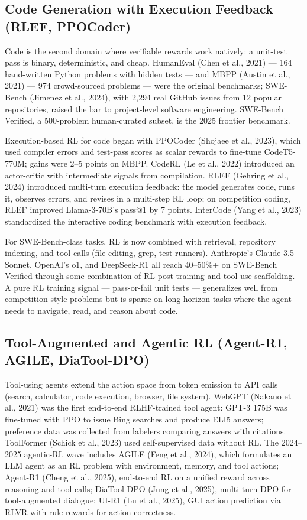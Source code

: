 \subsection{Code Generation with Execution Feedback (RLEF, PPOCoder)}\label{code-generation-with-execution-feedback-rlef-ppocoder}

Code is the second domain where verifiable rewards work natively: a unit-test pass is binary, deterministic, and cheap. HumanEval (Chen et al., 2021) --- 164 hand-written Python problems with hidden tests --- and MBPP (Austin et al., 2021) --- 974 crowd-sourced problems --- were the original benchmarks; SWE-Bench (Jimenez et al., 2024), with 2,294 real GitHub issues from 12 popular repositories, raised the bar to project-level software engineering. SWE-Bench Verified, a 500-problem human-curated subset, is the 2025 frontier benchmark.

Execution-based RL for code began with PPOCoder (Shojaee et al., 2023), which used compiler errors and test-pass scores as scalar rewards to fine-tune CodeT5-770M; gains were 2--5 points on MBPP. CodeRL (Le et al., 2022) introduced an actor-critic with intermediate signals from compilation. RLEF (Gehring et al., 2024) introduced multi-turn execution feedback: the model generates code, runs it, observes errors, and revises in a multi-step RL loop; on competition coding, RLEF improved Llama-3-70B's pass@1 by 7 points. InterCode (Yang et al., 2023) standardized the interactive coding benchmark with execution feedback.

For SWE-Bench-class tasks, RL is now combined with retrieval, repository indexing, and tool calls (file editing, grep, test runners). Anthropic's Claude 3.5 Sonnet, OpenAI's o1, and DeepSeek-R1 all reach 40--50\%+ on SWE-Bench Verified through some combination of RL post-training and tool-use scaffolding. A pure RL training signal --- pass-or-fail unit tests --- generalizes well from competition-style problems but is sparse on long-horizon tasks where the agent needs to navigate, read, and reason about code.

\subsection{Tool-Augmented and Agentic RL (Agent-R1, AGILE, DiaTool-DPO)}\label{tool-augmented-and-agentic-rl-agent-r1-agile-diatool-dpo}

Tool-using agents extend the action space from token emission to API calls (search, calculator, code execution, browser, file system). WebGPT (Nakano et al., 2021) was the first end-to-end RLHF-trained tool agent: GPT-3 175B was fine-tuned with PPO to issue Bing searches and produce ELI5 answers; preference data was collected from labelers comparing answers with citations. ToolFormer (Schick et al., 2023) used self-supervised data without RL. The 2024--2025 agentic-RL wave includes AGILE (Feng et al., 2024), which formulates an LLM agent as an RL problem with environment, memory, and tool actions; Agent-R1 (Cheng et al., 2025), end-to-end RL on a unified reward across reasoning and tool calls; DiaTool-DPO (Jung et al., 2025), multi-turn DPO for tool-augmented dialogue; UI-R1 (Lu et al., 2025), GUI action prediction via RLVR with rule rewards for action correctness.

